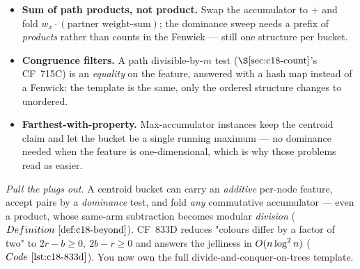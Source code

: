 \begin{hardeningbox}
\begin{itemize}[nosep]
  \item \textbf{Sum of path products, not product.} Swap the accumulator to \(+\) and fold
        \(w_x\cdot(\text{partner weight-sum})\); the dominance sweep needs a prefix of
        \emph{products} rather than counts in the Fenwick --- still one structure per bucket.
  \item \textbf{Congruence filters.} A path divisible-by-\(m\) test (\(\secref{c18-count}\)'s
        CF~715C) is an \emph{equality} on the feature, answered with a hash map instead of a
        Fenwick: the template is the same, only the ordered structure changes to unordered.
  \item \textbf{Farthest-with-property.} Max-accumulator instances keep the centroid claim
        and let the bucket be a single running maximum --- no dominance needed when the
        feature is one-dimensional, which is why those problems read as easier.
\end{itemize}
\end{hardeningbox}

\begin{recallbox}
\emph{Pull the plugs out.} A centroid bucket can carry an \emph{additive} per-node feature,
accept pairs by a \emph{dominance} test, and fold \emph{any} commutative accumulator --- even
a product, whose same-arm subtraction becomes modular \emph{division}
(\(\defref{c18-beyond}\)). CF~833D reduces "colours differ by a factor of two" to
\(2r-b\ge0,\ 2b-r\ge0\) and answers the jelliness in \(O(n\log^2 n)\)
(\(\coderef{c18-833d}\)). You now own the full divide-and-conquer-on-trees template.
\end{recallbox}
